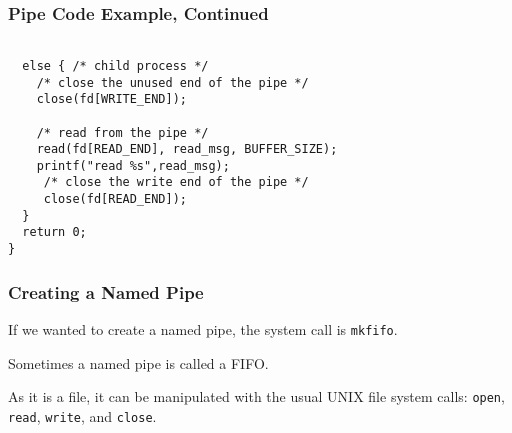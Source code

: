 \begin{frame}[fragile]
\frametitle{Pipe Code Example, Continued}


\begin{verbatim}

  else { /* child process */
    /* close the unused end of the pipe */ 
    close(fd[WRITE_END]);
    
    /* read from the pipe */
    read(fd[READ_END], read_msg, BUFFER_SIZE); 
    printf("read %s",read_msg);
     /* close the write end of the pipe */
     close(fd[READ_END]);
  }
  return 0;
}
\end{verbatim}

\end{frame}

\begin{frame}
\frametitle{Creating a Named Pipe}

If we wanted to create a named pipe, the system call is \texttt{mkfifo}. 

Sometimes a named pipe is called a FIFO. 

As it is a file, it can be manipulated with the usual UNIX file system calls: \texttt{open}, \texttt{read}, \texttt{write}, and \texttt{close}.

\end{frame}



